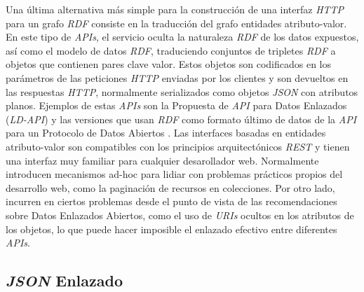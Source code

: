 Una \'ultima alternativa m\'as simple para la construcci\'on de una interfaz \textit{HTTP} para un grafo \textit{RDF} consiste en la traducci\'on del grafo entidades atributo-valor. En este tipo de \textit{APIs}, el servicio oculta la naturaleza \textit{RDF} de los datos expuestos, as\'i como el modelo de datos \textit{RDF}, traduciendo conjuntos de tripletes \textit{RDF} a objetos que contienen pares clave valor. Estos objetos son codificados en los par\'ametros de las peticiones \textit{HTTP} enviadas por los clientes y son devueltos en las respuestas \textit{HTTP}, normalmente serializados como objetos \textit{JSON} con atributos planos. Ejemplos de estas \textit{APIs} son la Propuesta de \textit{API} para Datos Enlazados (\textit{LD-API}) \cite{ld_api} y las versiones que usan \textit{RDF} como formato \'ultimo de datos de la \textit{API} para un Protocolo de Datos Abiertos \cite{fatland2011open}. Las interfaces basadas en entidades atributo-valor son compatibles con los principios arquitect\'onicos \textit{REST} y tienen una interfaz muy familiar para cualquier desarollador web. Normalmente introducen mecanismos ad-hoc para lidiar con problemas pr\'acticos propios del desarrollo web, como la paginaci\'on de recursos en colecciones. Por otro lado, incurren en ciertos problemas desde el punto de vista de las recomendaciones sobre Datos Enlazados Abiertos, como el uso de \textit{URIs} ocultos en los atributos de los objetos, lo que puede hacer imposible el enlazado efectivo entre diferentes \textit{APIs}.\\

\subsection{\textit{JSON} Enlazado}

